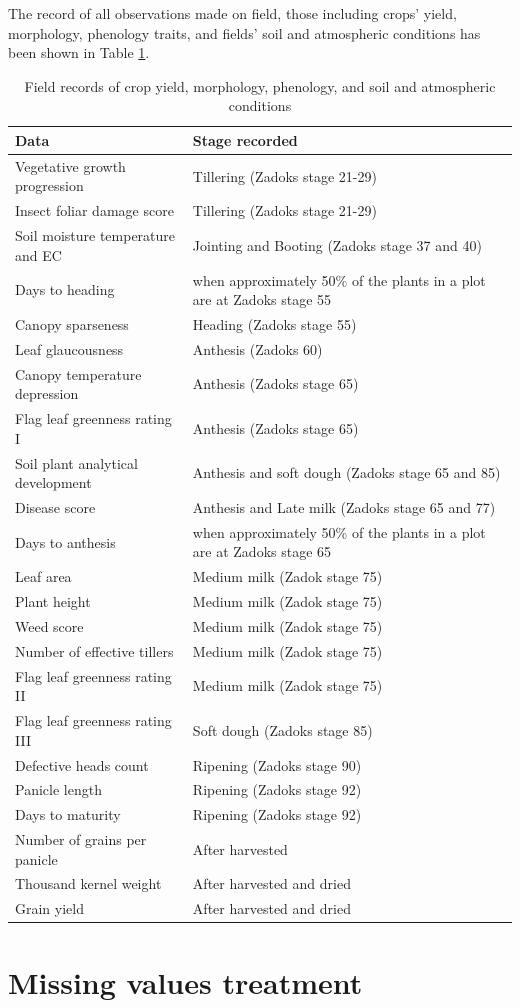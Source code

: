\documentclass[12pt,oneside]{dukestatscithesis} %
\begin{document}
The record of all observations made on field, those including crops' yield, morphology, phenology traits, and fields' soil and atmospheric conditions has been shown in Table \ref{tab:yld-morph-md}.
\begin{longtable}[t]{>{\raggedright\arraybackslash}p{5.2cm}>{\raggedright\arraybackslash}p{8.2cm}}
\caption{\label{tab:yld-morph-md}Field records of crop yield, morphology, phenology, and soil and atmospheric conditions}\\
\toprule
Data & Stage recorded\\
\midrule
Vegetative growth progression & Tillering (Zadoks stage 21-29)\\
Insect foliar damage score & Tillering (Zadoks stage 21-29)\\
Soil moisture temperature and EC & Jointing and Booting (Zadoks stage 37 and 40)\\
Days to heading & when approximately 50\% of the plants in a plot are at Zadoks stage 55\\
Canopy sparseness & Heading (Zadoks stage 55)\\
\addlinespace
Leaf glaucousness & Anthesis (Zadoks 60)\\
Canopy temperature depression & Anthesis (Zadoks stage 65)\\
Flag leaf greenness rating I & Anthesis (Zadoks stage 65)\\
Soil plant analytical development & Anthesis and soft dough (Zadoks stage 65 and 85)\\
Disease score & Anthesis and Late milk (Zadoks stage 65 and 77)\\
\addlinespace
Days to anthesis & when approximately 50\% of the plants in a plot are at Zadoks stage 65\\
Leaf area & Medium milk (Zadok stage 75)\\
Plant height & Medium milk (Zadok stage 75)\\
Weed score & Medium milk (Zadok stage 75)\\
Number of effective tillers & Medium milk (Zadok stage 75)\\
\addlinespace
Flag leaf greenness rating II & Medium milk (Zadok stage 75)\\
Flag leaf greenness rating III & Soft dough (Zadoks stage 85)\\
Defective heads count & Ripening (Zadoks stage 90)\\
Panicle length & Ripening (Zadoks stage 92)\\
Days to maturity & Ripening (Zadoks stage 92)\\
\addlinespace
Number of grains per panicle & After harvested\\
Thousand kernel weight & After harvested and dried\\
Grain yield & After harvested and dried\\
\bottomrule
\end{longtable}
\hypertarget{missing-values-treatment}{%
\section{Missing values treatment}\label{missing-values-treatment}}
\end{document}
